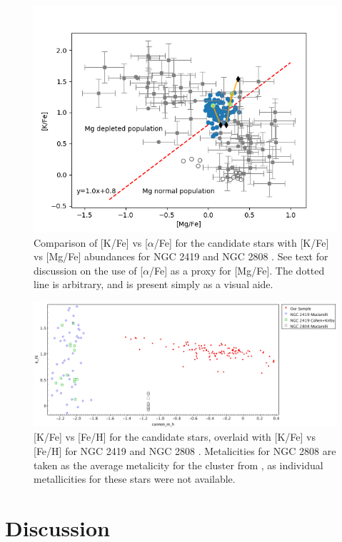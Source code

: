 \documentclass[a4paper,fleqn,usenatbib]{mnras}
\begin{document}
\begin{figure}
	\includegraphics[width=\columnwidth]{Kvsmgmod.png}
    \caption{Comparison of [K/Fe] vs [$\alpha$/Fe] for the candidate stars with [K/Fe] vs [Mg/Fe] abundances for NGC 2419 and NGC 2808 \citep{cohenkirby2012, mucciarelli2012, mucciarelli2015}. See text for discussion on the use of [$\alpha$/Fe] as a proxy for [Mg/Fe]. The dotted line is arbitrary, and is present simply as a visual aide.}
    \label{KvsMg}
\end{figure}

\begin{figure}
	\includegraphics[width=\columnwidth]{KvsFe.png}
    \caption{[K/Fe] vs [Fe/H] for the candidate stars, overlaid with [K/Fe] vs [Fe/H] for NGC 2419 and NGC 2808 \citep{cohenkirby2012, mucciarelli2012, mucciarelli2015}. Metalicities for NGC 2808 are taken as the average metalicity for the cluster from \citet{harris1996}, as individual metallicities for these stars were not available.}
    \label{KvsFe}
\end{figure}

\section{Discussion}
\label{sec:discussion}
\end{document}
